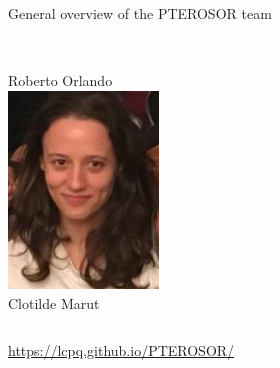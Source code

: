 \documentclass[aspectratio=169,9pt]{beamer}
\begin{document}
\begin{frame}{General overview of the PTEROSOR team}
\begin{columns}
\begin{column}{0.325\textwidth}
                        \\
                        Roberto Orlando
                        \\
			\vspace{0.25cm}
                        \includegraphics[width=0.3\textwidth]{fig/Clotilde}
                        \\
                        Clotilde Marut
                        \\
                \end{column}
        \end{columns}
			\vspace{-0.5cm}
        \url{https://lcpq.github.io/PTEROSOR/}
\end{frame}
\end{document}
